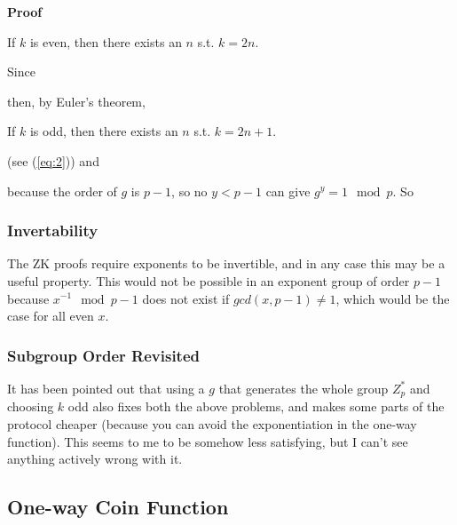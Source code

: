 \documentclass[a4paper,titlepage]{article}
\begin{document}

{\bf Proof}

If $k$ is even, then there exists an $n$
s.t. $k=2n$.


Since


then, by Euler's theorem, 


If $k$ is odd, then there exists an $n$ s.t. $k=2n+1$.



(see (\ref{eq:2})) and


because the order of $g$ is $p-1$, so no $y < p-1$ can give $g^y=1
 \mod p$. So


\subsubsection{Invertability}

The ZK proofs require exponents to be invertible, and in any case this
may be a useful property. This would not be possible in an exponent
group of order $p-1$ because $x^{-1}
\mod{p-1}$ does not exist if $gcd(x,p-1) \neq 1$, which would be the
case for all even $x$.

\subsubsection{Subgroup Order Revisited}

It has been pointed out that using a $g$ that generates the whole
group $Z_p^*$ and choosing $k$ odd also fixes both the above problems,
and makes some parts of the protocol cheaper (because you can avoid
the exponentiation in the one-way function). This seems to me to be
somehow less satisfying, but I can't see anything actively wrong with
it.

\subsection{One-way Coin Function}
\label{sec:oneway}
\end{document}
